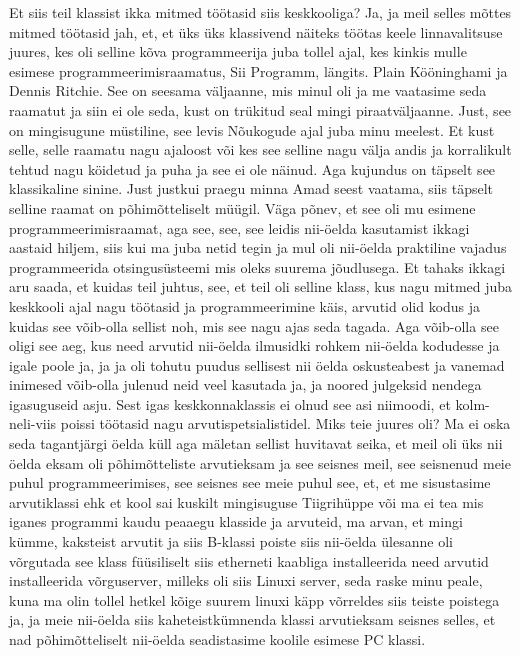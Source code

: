 Et siis teil klassist ikka mitmed töötasid siis keskkooliga?
Ja, ja meil selles mõttes mitmed töötasid jah, et, et üks üks klassivend näiteks töötas keele linnavalitsuse juures, kes oli selline kõva programmeerija juba tollel ajal, kes kinkis mulle esimese programmeerimisraamatus, Sii Programm, längits. Plain Kööninghami ja Dennis Ritchie.
See on seesama väljaanne, mis minul oli ja me vaatasime seda raamatut ja siin ei ole seda, kust on trükitud seal mingi piraatväljaanne. Just, see on mingisugune müstiline, see levis Nõukogude ajal juba minu meelest. Et kust selle, selle raamatu nagu ajaloost või kes see selline nagu välja andis ja korralikult tehtud nagu köidetud ja puha ja see ei ole näinud. Aga kujundus on täpselt see klassikaline sinine.
Just justkui praegu minna Amad seest vaatama, siis täpselt selline raamat on põhimõtteliselt müügil. Väga põnev, et see oli mu esimene programmeerimisraamat, aga see, see, see leidis nii-öelda kasutamist ikkagi aastaid hiljem, siis kui ma juba netid tegin ja mul oli nii-öelda praktiline vajadus programmeerida otsingusüsteemi mis oleks suurema jõudlusega.
Et tahaks ikkagi aru saada, et kuidas teil juhtus, see, et teil oli selline klass, kus nagu mitmed juba keskkooli ajal nagu töötasid ja programmeerimine käis, arvutid olid kodus ja kuidas see võib-olla sellist noh, mis see nagu ajas seda tagada.
Aga võib-olla see oligi see aeg, kus need arvutid nii-öelda ilmusidki rohkem nii-öelda kodudesse ja igale poole ja, ja ja oli tohutu puudus sellisest nii öelda oskusteabest ja vanemad inimesed võib-olla julenud neid veel kasutada ja, ja noored julgeksid nendega igasuguseid asju.
Sest igas keskkonnaklassis ei olnud see asi niimoodi, et kolm-neli-viis poissi töötasid nagu arvutispetsialistidel. Miks teie juures oli?
Ma ei oska seda tagantjärgi öelda küll aga mäletan sellist huvitavat seika, et meil oli üks nii öelda eksam oli põhimõtteliste arvutieksam ja see seisnes meil, see seisnenud meie puhul programmeerimises, see seisnes see meie puhul see, et, et me sisustasime arvutiklassi ehk et kool sai kuskilt mingisuguse Tiigrihüppe või ma ei tea mis iganes programmi kaudu peaaegu klasside ja arvuteid, ma arvan, et mingi kümme, kaksteist arvutit ja siis B-klassi poiste siis nii-öelda ülesanne oli võrgutada see klass füüsiliselt siis etherneti kaabliga installeerida need arvutid installeerida võrguserver, milleks oli siis Linuxi server, seda raske minu peale, kuna ma olin tollel hetkel kõige suurem linuxi käpp võrreldes siis teiste poistega ja, ja meie nii-öelda siis kaheteistkümnenda klassi arvutieksam seisnes selles, et nad põhimõtteliselt nii-öelda seadistasime koolile esimese PC klassi.
